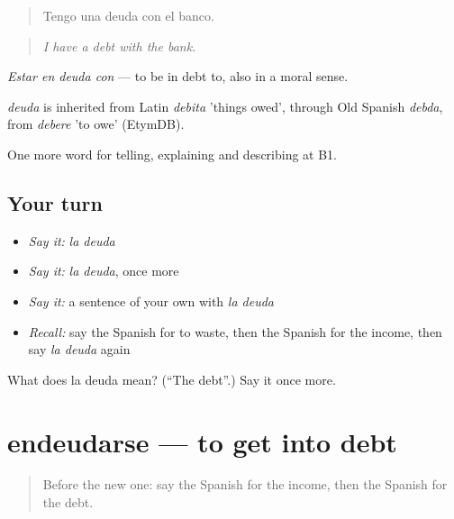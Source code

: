 \begin{quote}
Tengo una deuda con el banco.
\end{quote}

\begin{quote}
\emph{I have a debt with the bank.}
\end{quote}

\emph{Estar en deuda con} — to be in debt to, also in a moral sense.

\begin{cousinweb}
\emph{deuda} is inherited from Latin \emph{debita} 'things owed', through Old Spanish \emph{debda}, from \emph{debere} 'to owe' (EtymDB).
\end{cousinweb}

\begin{grammarlens}[title={What you've built}]
One more word for telling, explaining and describing at B1.
\end{grammarlens}

\subsection*{Your turn}
\begin{itemize}
\raggedright
  \item \emph{Say it:} \emph{la deuda}
  \item \emph{Say it:} \emph{la deuda}, once more
  \item \emph{Say it:} a sentence of your own with \emph{la deuda}
  \item \emph{Recall:} say the Spanish for to waste, then the Spanish for the income, then say \emph{la deuda} again
\end{itemize}

\begin{tcolorbox}[breakable,colback=teal!4,colframe=teal!35!black,title={Before you move on}]
What does la deuda mean? (\textquotedblleft{}The debt\textquotedblright{}.) Say it once more.
\end{tcolorbox}
\section[endeudarse]{endeudarse — to get into debt}

\label{lesson:ES-C627-endeudarse}



\begin{quote}
Before the new one: say the Spanish for the income, then the Spanish for the debt.
\end{quote}

